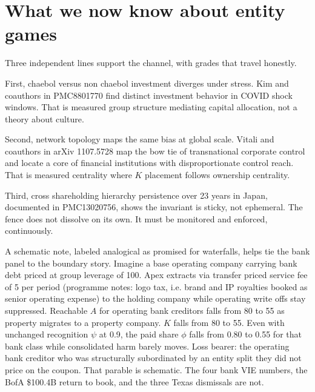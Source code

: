 \section{What we now know about entity games}

Three independent lines support the channel, with grades that travel honestly.

First, chaebol versus non chaebol investment diverges under stress. Kim and coauthors in PMC8801770 find distinct investment behavior in COVID shock windows. That is measured group structure mediating capital allocation, not a theory about culture.

Second, network topology maps the same bias at global scale. Vitali and coauthors in arXiv 1107.5728 map the bow tie of transnational corporate control and locate a core of financial institutions with disproportionate control reach. That is measured centrality where $K$ placement follows ownership centrality.

Third, cross shareholding hierarchy persistence over 23 years in Japan, documented in PMC13020756, shows the invariant is sticky, not ephemeral. The fence does not dissolve on its own. It must be monitored and enforced, continuously.

A schematic note, labeled analogical as promised for waterfalls, helps tie the bank panel to the boundary story. Imagine a base operating company carrying bank debt priced at group leverage of 100. Apex extracts via transfer priced service fee of 5 per period (programme notes: logo tax, i.e. brand and IP royalties booked as senior operating expense) to the holding company while operating write offs stay suppressed. Reachable $A$ for operating bank creditors falls from 80 to 55 as property migrates to a property company. $K$ falls from 80 to 55. Even with unchanged recognition $\psi$ at 0.9, the paid share $\phi$ falls from 0.80 to 0.55 for that bank class while consolidated harm barely moves. Loss bearer: the operating bank creditor who was structurally subordinated by an entity split they did not price on the coupon. That parable is schematic. The four bank VIE numbers, the BofA \$100.4B return to book, and the three Texas dismissals are not.

